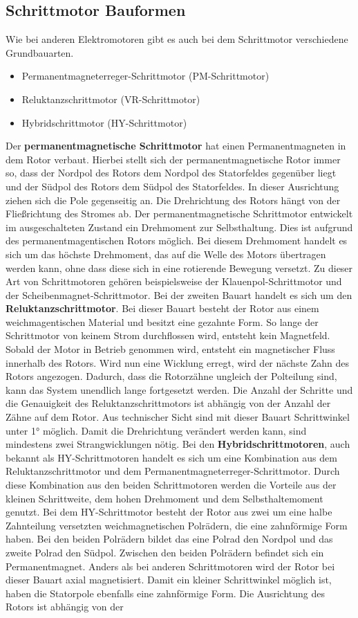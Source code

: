 \subsection{Schrittmotor Bauformen}
Wie bei anderen Elektromotoren gibt es auch bei dem Schrittmotor verschiedene Grundbauarten. 
\begin{itemize}
	\item {Permanentmagneterreger-Schrittmotor (PM-Schrittmotor)}
	\item {Reluktanzschrittmotor (VR-Schrittmotor)}
	\item {Hybridschrittmotor (HY-Schrittmotor)}
\end{itemize}
Der \textbf{permanentmagnetische Schrittmotor} hat einen Permanentmagneten in dem Rotor verbaut. Hierbei stellt sich der permanentmagnetische Rotor immer so, dass der Nordpol des Rotors dem Nordpol des Statorfeldes gegenüber liegt und der Südpol des Rotors dem Südpol des Statorfeldes. In dieser Ausrichtung ziehen sich die Pole gegenseitig an. Die Drehrichtung des Rotors hängt von der Fließrichtung des Stromes ab. Der permanentmagnetische Schrittmotor entwickelt im ausgeschalteten Zustand ein Drehmoment zur Selbsthaltung. Dies ist aufgrund des permanentmagentischen Rotors möglich. Bei diesem Drehmoment handelt es sich um das höchste Drehmoment, das auf die Welle des Motors übertragen werden kann, ohne dass diese sich in eine rotierende Bewegung versetzt. Zu dieser Art von Schrittmotoren gehören beispielsweise der Klauenpol-Schrittmotor und der Scheibenmagnet-Schrittmotor. Bei der zweiten Bauart handelt es sich um den \textbf{Reluktanzschrittmotor}. Bei dieser Bauart besteht der Rotor aus einem weichmagentischen Material und besitzt eine gezahnte Form. So lange der Schrittmotor von keinem Strom durchflossen wird, entsteht kein Magnetfeld. Sobald der Motor in Betrieb genommen wird, entsteht ein magnetischer Fluss innerhalb des Rotors. Wird nun eine Wicklung erregt, wird der nächste Zahn des Rotors angezogen. Dadurch, dass die Rotorzähne ungleich der Polteilung sind, kann das System unendlich lange fortgesetzt werden. Die Anzahl der Schritte und die Genauigkeit des Reluktanzschrittmotors ist abhängig von der Anzahl der Zähne auf dem Rotor. Aus technischer Sicht sind mit dieser Bauart Schrittwinkel unter 1° möglich. Damit die Drehrichtung verändert werden kann, sind mindestens zwei Strangwicklungen nötig. Bei den \textbf{Hybridschrittmotoren}, auch bekannt als HY-Schrittmotoren handelt es sich um eine Kombination aus dem Reluktanzschrittmotor und dem Permanentmagneterreger-Schrittmotor. Durch diese Kombination aus den beiden Schrittmotoren werden die Vorteile aus der kleinen Schrittweite, dem hohen Drehmoment und dem Selbsthaltemoment genutzt. Bei dem HY-Schrittmotor besteht der Rotor aus zwei um eine halbe Zahnteilung versetzten weichmagnetischen Polrädern, die eine zahnförmige Form haben. Bei den beiden Polrädern bildet das eine Polrad den Nordpol und das zweite Polrad den Südpol. Zwischen den beiden Polrädern befindet sich ein Permanentmagnet. Anders als bei anderen Schrittmotoren wird der Rotor bei dieser Bauart axial magnetisiert. Damit ein kleiner Schrittwinkel möglich ist, haben die Statorpole ebenfalls eine zahnförmige Form. Die Ausrichtung des Rotors ist abhängig von der 